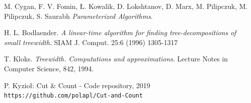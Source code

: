 \documentclass[12pt, oneside]{report}
\begin{document}
\newpage
	\begin{thebibliography}{9}
			M. Cygan, F. V. Fomin, Ł. Kowalik, D. Lokshtanov, D. Marx, M. Pilipczuk, M. Pilipczuk, S. Saurabh
 			\textit{Parameterized Algorithms}.
 					
			H. L. Bodlaender. 
			\textit{A linear-time algorithm for finding tree-decompositions of small treewidth}. 
			SIAM J. Comput. 25:6 (1996) 1305-1317		
		
			T. Kloks. 
			\textit{Treewidth. Computations and approximations}. 
			Lecture Notes in Computer Science, 842, 1994.
 			
			P. Kyzioł: Cut \& Count - Code repository, 2019
			\\\texttt{https://github.com/polapl/Cut-and-Count}
	\end{thebibliography} 
\end{document}
